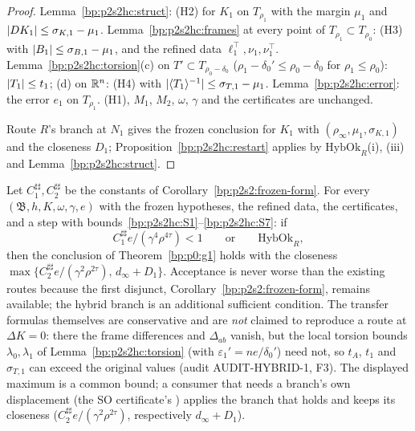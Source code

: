 \begin{proof}
\label{step:p2s2hc:g-hyp}
Lemma~\ref{bp:p2s2hc:struct}: (H2) for $K_1$ on $T_{\rho_1}$ with the margin $\mu_1$ and $\lvert DK_1\rvert\le\sigma_{K,1}-\mu_1$. Lemma~\ref{bp:p2s2hc:frames} at every point of
$T_{\rho_1}\subset T_{\rho_0}$: (H3) with $\lvert B_1\rvert\le\sigma_{B,1}-\mu_1$, and the refined data $\ell_1^\top,\nu_1,\nu_1^\top$. Lemma~\ref{bp:p2s2hc:torsion}(c) on $T'\subset T_{\rho_0-\delta_0}$
($\rho_1-\delta_0'\le\rho_0-\delta_0$ for $\rho_1\le\rho_0$): $\lvert T_1\rvert\le t_1$; (d) on $\mathbb{R}^n$: (H4) with $\lvert \langle T_1\rangle^{-1}\rvert\le\sigma_{T,1}-\mu_1$. Lemma~\ref{bp:p2s2hc:error}: the error
$e_1$ on $T_{\rho_1}$. (H1), $M_1$, $M_2$, $\omega$, $\gamma$ and the certificates are unchanged.

\label{step:p2s2hc:g-rs}
Route $R$'s branch at $N_1$ gives the frozen conclusion for $K_1$ with $(\rho_\infty,\mu_1,\sigma_{K,1})$ and the closeness $D_1$; Proposition~\ref{bp:p2s2hc:restart}
applies by $\mathrm{HybOk}_R$(i), (iii) and Lemma~\ref{bp:p2s2hc:struct}.
\end{proof}

\begin{corollary}\label{bp:p2s2hc:frozen}
Let $C_1^{\sharp\sharp},C_2^{\sharp\sharp}$ be the constants of Corollary~\ref{bp:p2s2:frozen-form}. For every $(\mathfrak B,h,K,\omega,\gamma,e)$ with the frozen hypotheses,
the refined data, the certificates, and a step with bounds~\ref{bp:p2s2hc:S1}--\ref{bp:p2s2hc:S7}: if
\[
C_1^{\sharp\sharp}e/(\gamma^4\rho^{4\tau})<1\qquad\text{or}\qquad\mathrm{HybOk}_R,
\]
then the conclusion of Theorem~\ref{bp:p0:g1} holds with the closeness $\max\{C_2^{\sharp\sharp}e/(\gamma^2\rho^{2\tau}),\,d_\infty+D_1\}$. Acceptance is
never worse than the existing routes because the first disjunct, Corollary~\ref{bp:p2s2:frozen-form}, remains available; the hybrid branch is an
additional sufficient condition. The transfer formulas themselves are conservative and are \emph{not} claimed to reproduce a route at $\Delta K=0$:
there the frame differences and $\Delta_{ab}$ vanish, but the local torsion bounds $\lambda_0,\lambda_1$ of Lemma~\ref{bp:p2s2hc:torsion} (with $\varepsilon_1'=ne/\delta_0'$)
need not, so $t_A$, $t_1$ and $\sigma_{T,1}$ can exceed the original values (audit AUDIT-HYBRID-1, F3). The displayed maximum is a common bound; a
consumer that needs a branch's own displacement (the SO certificate's ) applies the branch that holds and keeps its closeness
($C_2^{\sharp\sharp}e/(\gamma^2\rho^{2\tau})$, respectively $d_\infty+D_1$).
\end{corollary}

